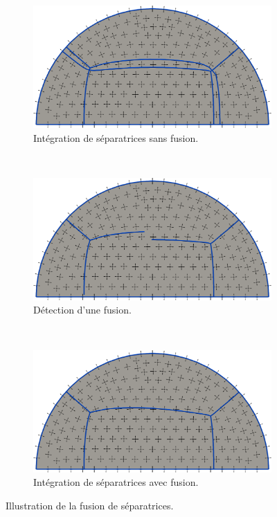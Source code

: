 \begin{figure}[!h]
\centering
\begin{subfigure}{0.65\textwidth}
    \includegraphics[width=\textwidth]{images/decoup_sans_fusion.pdf}
    \caption{Intégration de séparatrices sans fusion.}
    \label{fig:decoup_sans_fusion}
\end{subfigure}
\\[0.5cm]
\begin{subfigure}{0.65\textwidth}
    \includegraphics[width=\textwidth]{images/decoup_detect_fusion.pdf}
    \caption{Détection d'une fusion.}
    \label{fig:decoup_detect_fusion}
\end{subfigure}
\\[0.5cm]
\begin{subfigure}{0.65\textwidth}
    \includegraphics[width=\textwidth]{images/decoup_fusion.pdf}
    \caption{Intégration de séparatrices avec fusion.}
    \label{fig:decoup_fusion}
\end{subfigure}
\caption{Illustration de la fusion de séparatrices.}
\label{fig:fusion}
\end{figure}

